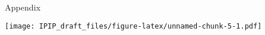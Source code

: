 \clearpage
\makeatletter
\efloat@restorefloats
\makeatother


\begin{appendix}
\section{}
Appendix

\texttt{[image: IPIP\_draft\_files/figure-latex/unnamed-chunk-5-1.pdf]}
\end{appendix}
